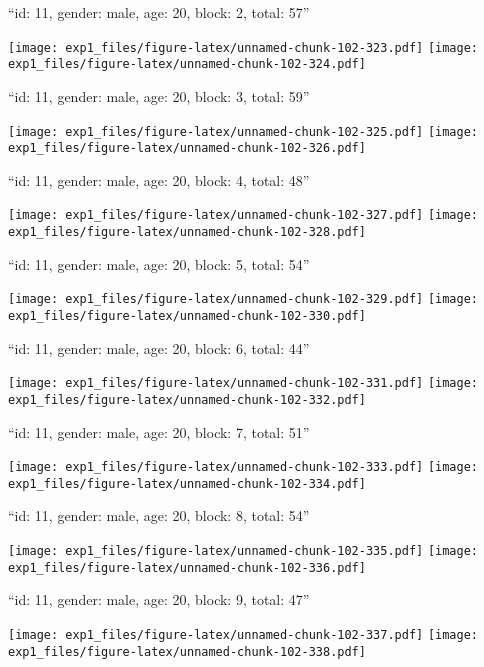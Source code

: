 \documentclass[11pt,,]{article}
\begin{document}
\newpage
[1] 

``id: 11, gender: male, age: 20, block: 2, total: 57''

\texttt{[image: exp1\_files/figure-latex/unnamed-chunk-102-323.pdf]}
\texttt{[image: exp1\_files/figure-latex/unnamed-chunk-102-324.pdf]}

\newpage
[1] 

``id: 11, gender: male, age: 20, block: 3, total: 59''

\texttt{[image: exp1\_files/figure-latex/unnamed-chunk-102-325.pdf]}
\texttt{[image: exp1\_files/figure-latex/unnamed-chunk-102-326.pdf]}

\newpage
[1] 

``id: 11, gender: male, age: 20, block: 4, total: 48''

\texttt{[image: exp1\_files/figure-latex/unnamed-chunk-102-327.pdf]}
\texttt{[image: exp1\_files/figure-latex/unnamed-chunk-102-328.pdf]}

\newpage
[1] 

``id: 11, gender: male, age: 20, block: 5, total: 54''

\texttt{[image: exp1\_files/figure-latex/unnamed-chunk-102-329.pdf]}
\texttt{[image: exp1\_files/figure-latex/unnamed-chunk-102-330.pdf]}

\newpage
[1] 

``id: 11, gender: male, age: 20, block: 6, total: 44''

\texttt{[image: exp1\_files/figure-latex/unnamed-chunk-102-331.pdf]}
\texttt{[image: exp1\_files/figure-latex/unnamed-chunk-102-332.pdf]}

\newpage
[1] 

``id: 11, gender: male, age: 20, block: 7, total: 51''

\texttt{[image: exp1\_files/figure-latex/unnamed-chunk-102-333.pdf]}
\texttt{[image: exp1\_files/figure-latex/unnamed-chunk-102-334.pdf]}

\newpage
[1] 

``id: 11, gender: male, age: 20, block: 8, total: 54''

\texttt{[image: exp1\_files/figure-latex/unnamed-chunk-102-335.pdf]}
\texttt{[image: exp1\_files/figure-latex/unnamed-chunk-102-336.pdf]}

\newpage
[1] 

``id: 11, gender: male, age: 20, block: 9, total: 47''

\texttt{[image: exp1\_files/figure-latex/unnamed-chunk-102-337.pdf]}
\texttt{[image: exp1\_files/figure-latex/unnamed-chunk-102-338.pdf]}
\end{document}
